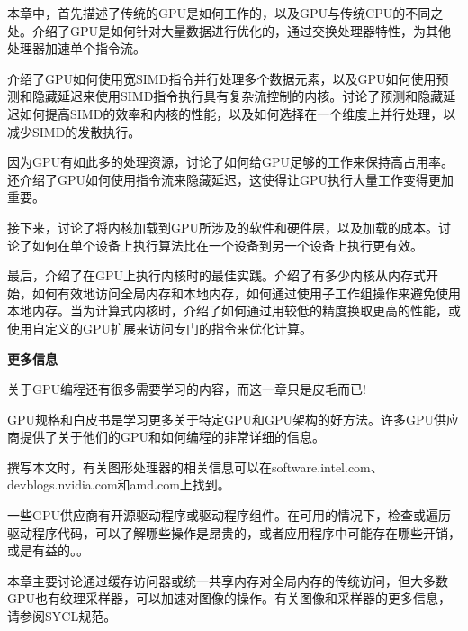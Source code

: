 
本章中，首先描述了传统的GPU是如何工作的，以及GPU与传统CPU的不同之处。介绍了GPU是如何针对大量数据进行优化的，通过交换处理器特性，为其他处理器加速单个指令流。\par

介绍了GPU如何使用宽SIMD指令并行处理多个数据元素，以及GPU如何使用预测和隐藏延迟来使用SIMD指令执行具有复杂流控制的内核。讨论了预测和隐藏延迟如何提高SIMD的效率和内核的性能，以及如何选择在一个维度上并行处理，以减少SIMD的发散执行。\par

因为GPU有如此多的处理资源，讨论了如何给GPU足够的工作来保持高占用率。还介绍了GPU如何使用指令流来隐藏延迟，这使得让GPU执行大量工作变得更加重要。\par

接下来，讨论了将内核加载到GPU所涉及的软件和硬件层，以及加载的成本。讨论了如何在单个设备上执行算法比在一个设备到另一个设备上执行更有效。\par

最后，介绍了在GPU上执行内核时的最佳实践。介绍了有多少内核从内存式开始，如何有效地访问全局内存和本地内存，如何通过使用子工作组操作来避免使用本地内存。当为计算式内核时，介绍了如何通过用较低的精度换取更高的性能，或使用自定义的GPU扩展来访问专门的指令来优化计算。\par

\hspace*{\fill} \par %
\textbf{更多信息}

关于GPU编程还有很多需要学习的内容，而这一章只是皮毛而已!\par

GPU规格和白皮书是学习更多关于特定GPU和GPU架构的好方法。许多GPU供应商提供了关于他们的GPU和如何编程的非常详细的信息。\par

撰写本文时，有关图形处理器的相关信息可以在software.intel.com、devblogs.nvidia.com和amd.com上找到。\par

一些GPU供应商有开源驱动程序或驱动程序组件。在可用的情况下，检查或遍历驱动程序代码，可以了解哪些操作是昂贵的，或者应用程序中可能存在哪些开销，或是有益的。。\par

本章主要讨论通过缓存访问器或统一共享内存对全局内存的传统访问，但大多数GPU也有纹理采样器，可以加速对图像的操作。有关图像和采样器的更多信息，请参阅SYCL规范。\par

\newpage